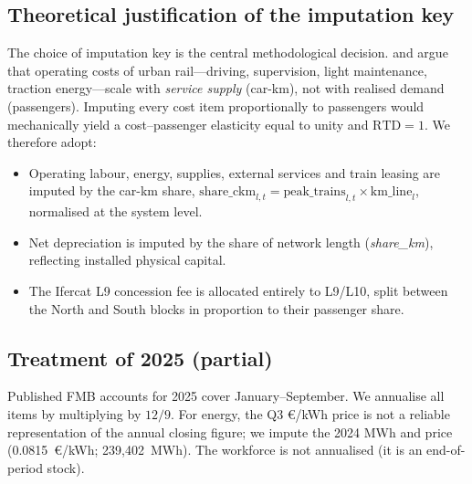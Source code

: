 \documentclass[11pt,a4paper]{article}
\begin{document}
\subsection{Theoretical justification of the imputation key}
The choice of imputation key is the central methodological decision.
\citet{small2007} and \citet{nashpreston1995} argue that operating costs
of urban rail---driving, supervision, light maintenance, traction
energy---scale with \emph{service supply} (car-km), not with realised
demand (passengers). Imputing every cost item proportionally to
passengers would mechanically yield a cost--passenger elasticity equal to
unity and $\text{RTD}=1$. We therefore adopt:

\begin{itemize}[leftmargin=*,topsep=2pt]
\item Operating labour, energy, supplies, external services and train
leasing are imputed by the car-km share,
$\text{share\_ckm}_{l,t}=\text{peak\_trains}_{l,t}\times
\text{km\_line}_l$, normalised at the system level.
\item Net depreciation is imputed by the share of network length
(\emph{share\_km}), reflecting installed physical capital.
\item The Ifercat L9 concession fee is allocated entirely to L9/L10,
split between the North and South blocks in proportion to their passenger
share.
\end{itemize}

\subsection{Treatment of 2025 (partial)}
Published FMB accounts for 2025 cover January--September. We annualise all
items by multiplying by $12/9$. For energy, the Q3 \euro{}/kWh price is
not a reliable representation of the annual closing figure; we impute the
2024 MWh and price (0.0815~\euro{}/kWh; 239{,}402~MWh). The workforce is
not annualised (it is an end-of-period stock).
\end{document}
